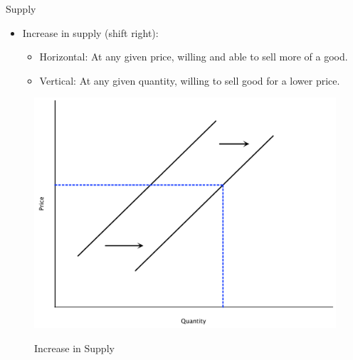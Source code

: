 \documentclass[xcolor={dvipsnames},pdf, hyperref={colorlinks=true, citecolor=ForestGreen, linkcolor=BlueViolet, urlcolor=Magenta}]{beamer}
\theoremstyle{definition}
\newcommand{\blank}[0]{}
\newcommand{\ddp}[1]{{\textcolor{ForestGreen}{#1}}}
\begin{document}
\begin{frame}[b]{Supply}
		\begin{itemize}
		\item Increase in supply (shift right): 
		\begin{itemize} 
			\item Horizontal: At any given price, willing and able to sell more of a good.
			\item Vertical: At any given quantity, willing to sell good for a lower price. 
		\end{itemize}
	\end{itemize}
\blank 
\blank 
\blank 
\blank
\begin{figure}[H]
		\ddp{\includegraphics[scale=.30]{plot11.pdf}}
		\caption{Increase in Supply}
	\end{figure}

\end{frame}
\end{document}
